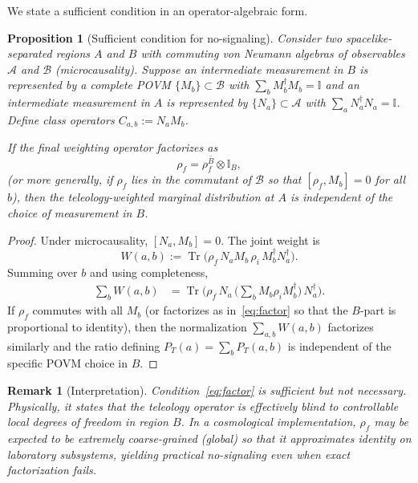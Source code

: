 \documentclass[reprint,amsmath,amssymb,aps,showkeys]{revtex4-2}
\newtheorem{proposition}{Proposition}
\newtheorem{remark}{Remark}
\newcommand{\Tr}{\operatorname{Tr}}
\newcommand{\cA}{\mathcal{A}}
\newcommand{\cB}{\mathcal{B}}
\newcommand{\cI}{\mathbb{I}}
\begin{document}
We state a sufficient condition in an operator-algebraic form.

\begin{proposition}[Sufficient condition for no-signaling]
Consider two spacelike-separated regions $A$ and $B$ with commuting von Neumann algebras of observables $\cA$ and $\cB$ (microcausality). Suppose an intermediate measurement in $B$ is represented by a complete POVM $\{M_b\}\subset \cB$ with $\sum_b M_b^{\dagger}M_b=\cI$ and an intermediate measurement in $A$ is represented by $\{N_a\}\subset \cA$ with $\sum_a N_a^{\dagger}N_a=\cI$. Define class operators $C_{a,b}:=N_aM_b$.

If the final weighting operator factorizes as
\begin{equation}
\rho_f = \rho_f^{\bar B}\otimes \cI_{B},
\label{eq:factor}
\end{equation}
(or more generally, if $\rho_f$ lies in the commutant of $\cB$ so that $[\rho_f, M_b]=0$ for all $b$), then the teleology-weighted marginal distribution at $A$ is independent of the choice of measurement in $B$.
\end{proposition}

\begin{proof}
Under microcausality, $[N_a,M_b]=0$. The joint weight is
\begin{equation}
W(a,b):=\Tr\big(\rho_f\,N_aM_b\,\rho_i\,M_b^{\dagger}N_a^{\dagger}\big).
\end{equation}
Summing over $b$ and using completeness,
\begin{align}
\sum_b W(a,b)
&= \Tr\Big(\rho_f\,N_a\,\Big(\sum_b M_b\rho_i M_b^{\dagger}\Big)\,N_a^{\dagger}\Big).
\end{align}
If $\rho_f$ commutes with all $M_b$ (or factorizes as in~\eqref{eq:factor} so that the $B$-part is proportional to identity), then the normalization $\sum_{a,b} W(a,b)$ factorizes similarly and the ratio defining $P_T(a)=\sum_b P_T(a,b)$ is independent of the specific POVM choice in $B$.
\end{proof}

\begin{remark}[Interpretation]
Condition~\eqref{eq:factor} is sufficient but not necessary. Physically, it states that the teleology operator is effectively \emph{blind} to controllable local degrees of freedom in region $B$. In a cosmological implementation, $\rho_f$ may be expected to be extremely coarse-grained (global) so that it approximates identity on laboratory subsystems, yielding practical no-signaling even when exact factorization fails.
\end{remark}
\end{document}

